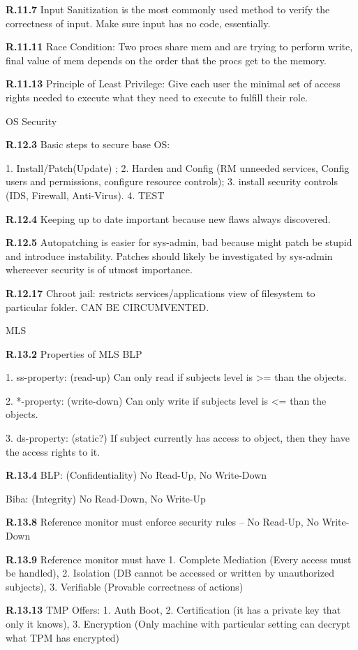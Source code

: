 \documentclass[8pt]{extreport}
\begin{document}
{\bf R.11.7}
Input Sanitization is the most commonly used method to verify the correctness of
input. Make sure input has no code, essentially.

{\bf R.11.11}
Race Condition: Two procs share mem and are trying to perform write, final value
of mem depends on the order that the procs get to the memory.

{\bf R.11.13}
Principle of Least Privilege: Give each user the minimal set of access rights
needed to execute what they need to execute to fulfill their role.


{\Huge OS Security}

{\bf R.12.3}
Basic steps to secure base OS:

1. Install/Patch(Update) ; 2. Harden and Config (RM unneeded services, Config users and permissions,
configure resource controls); 3. install security controls (IDS, Firewall,
Anti-Virus). 4. TEST


{\bf R.12.4}
Keeping up to date important because new flaws always discovered.

{\bf R.12.5}
Autopatching is easier for sys-admin, bad because might patch be stupid and
introduce instability. Patches should likely be investigated by sys-admin
whereever security is of utmost importance.




{\bf R.12.17}
Chroot jail: restricts services/applications view of filesystem to particular
folder. CAN BE CIRCUMVENTED.

{\Huge MLS}

{\bf R.13.2}
Properties of MLS BLP

1. ss-property: (read-up) Can only read if subjects level is >= than the objects.

2. *-property: (write-down) Can only write if subjects level is <= than the objects.

3. ds-property: (static?) If subject currently has access to object, then they have the
access rights to it.

{\bf R.13.4}
BLP: (Confidentiality) No Read-Up, No Write-Down

Biba: (Integrity) No Read-Down, No Write-Up

{\bf R.13.8}
Reference monitor must enforce security rules -- No Read-Up, No Write-Down

{\bf R.13.9}
Reference monitor must have 1. Complete Mediation (Every access must be
handled), 2. Isolation (DB cannot be accessed or written by unauthorized
subjects), 3. Verifiable (Provable correctness of actions)

{\bf R.13.13}
TMP Offers: 1. Auth Boot, 2. Certification (it has a private key that only it knows),
3. Encryption (Only machine with particular setting can decrypt what TPM has
encrypted)
\end{document}
